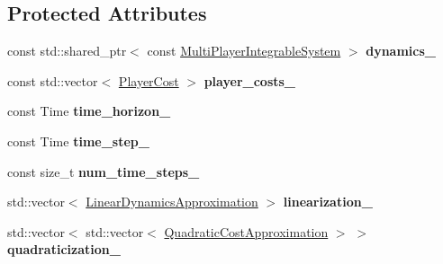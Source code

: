 \subsection*{Protected Attributes}
\begin{DoxyCompactItemize}
\item 
const std\+::shared\+\_\+ptr$<$ const \hyperlink{classilqgames_1_1_multi_player_integrable_system}{Multi\+Player\+Integrable\+System} $>$ {\bfseries dynamics\+\_\+}\hypertarget{classilqgames_1_1_game_solver_addd321f0c2c7a760bccd2e4f043b3725}{}\label{classilqgames_1_1_game_solver_addd321f0c2c7a760bccd2e4f043b3725}

\item 
const std\+::vector$<$ \hyperlink{classilqgames_1_1_player_cost}{Player\+Cost} $>$ {\bfseries player\+\_\+costs\+\_\+}\hypertarget{classilqgames_1_1_game_solver_a7ec8e339dd5dfd05a1bebfaa4ebc4c9c}{}\label{classilqgames_1_1_game_solver_a7ec8e339dd5dfd05a1bebfaa4ebc4c9c}

\item 
const Time {\bfseries time\+\_\+horizon\+\_\+}\hypertarget{classilqgames_1_1_game_solver_ae515fafef0ee7df96cfe1447d9f35581}{}\label{classilqgames_1_1_game_solver_ae515fafef0ee7df96cfe1447d9f35581}

\item 
const Time {\bfseries time\+\_\+step\+\_\+}\hypertarget{classilqgames_1_1_game_solver_ae1e0efeb25072ac9f21699b82071c6ab}{}\label{classilqgames_1_1_game_solver_ae1e0efeb25072ac9f21699b82071c6ab}

\item 
const size\+\_\+t {\bfseries num\+\_\+time\+\_\+steps\+\_\+}\hypertarget{classilqgames_1_1_game_solver_a8a95abeb47770462608d2f34b97c974e}{}\label{classilqgames_1_1_game_solver_a8a95abeb47770462608d2f34b97c974e}

\item 
std\+::vector$<$ \hyperlink{structilqgames_1_1_linear_dynamics_approximation}{Linear\+Dynamics\+Approximation} $>$ {\bfseries linearization\+\_\+}\hypertarget{classilqgames_1_1_game_solver_ad31cd30bf0b2fd95461672da928e91f2}{}\label{classilqgames_1_1_game_solver_ad31cd30bf0b2fd95461672da928e91f2}

\item 
std\+::vector$<$ std\+::vector$<$ \hyperlink{structilqgames_1_1_quadratic_cost_approximation}{Quadratic\+Cost\+Approximation} $>$ $>$ {\bfseries quadraticization\+\_\+}\hypertarget{classilqgames_1_1_game_solver_a039a0b26778f15ce89509452b11c5fb2}{}\label{classilqgames_1_1_game_solver_a039a0b26778f15ce89509452b11c5fb2}


\end{DoxyCompactItemize}

